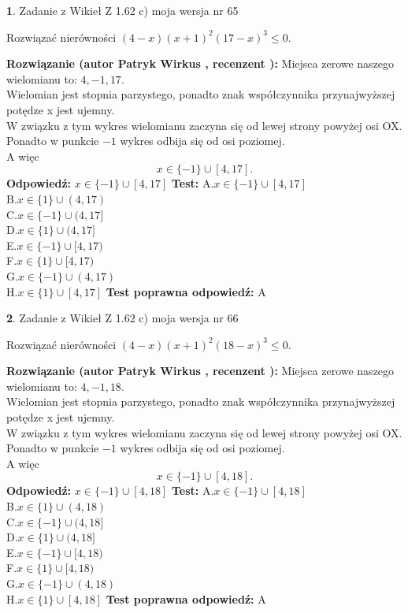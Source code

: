 \documentclass[12pt, a4paper]{article}
\theoremstyle{definition} %
\newtheorem{zad}{}
\newcommand{\zadStart}[1]{\begin{zad}#1\newline}
\newcommand{\zadStop}{\end{zad}}
\newcommand{\rozwStart}[2]{\noindent \textbf{Rozwiązanie (autor #1 , recenzent #2): }\newline}
\newcommand{\rozwStop}{\newline}
\newcommand{\odpStart}{\noindent \textbf{Odpowiedź:}\newline}
\newcommand{\odpStop}{\newline}
\newcommand{\testStart}{\noindent \textbf{Test:}\newline}
\newcommand{\testStop}{\newline}
\newcommand{\kluczStart}{\noindent \textbf{Test poprawna odpowiedź:}\newline}
\newcommand{\kluczStop}{\newline}
\begin{document}
\zadStart{Zadanie z Wikieł Z 1.62 c) moja wersja nr 65}

Rozwiązać nierówności $(4-x)(x+1)^{2}(17-x)^{3}\le0$.
\zadStop
\rozwStart{Patryk Wirkus}{}
Miejsca zerowe naszego wielomianu to: $4, -1, 17$.\\
Wielomian jest stopnia parzystego, ponadto znak współczynnika przy\linebreak najwyższej potędze x jest ujemny.\\ W związku z tym wykres wielomianu zaczyna się od lewej strony powyżej osi OX.\\
Ponadto w punkcie $-1$ wykres odbija się od osi poziomej.\\
A więc $$x \in \{-1\} \cup [4,17].$$
\rozwStop
\odpStart
$x \in \{-1\} \cup [4,17]$
\odpStop
\testStart
A.$x \in \{-1\} \cup [4,17]$\\
B.$x \in \{1\} \cup (4,17)$\\
C.$x \in \{-1\} \cup (4,17]$\\
D.$x \in \{1\} \cup (4,17]$\\
E.$x \in \{-1\} \cup [4,17)$\\
F.$x \in \{1\} \cup [4,17)$\\
G.$x \in \{-1\} \cup (4,17)$\\
H.$x \in \{1\} \cup [4,17]$
\testStop
\kluczStart
A
\kluczStop



\zadStart{Zadanie z Wikieł Z 1.62 c) moja wersja nr 66}

Rozwiązać nierówności $(4-x)(x+1)^{2}(18-x)^{3}\le0$.
\zadStop
\rozwStart{Patryk Wirkus}{}
Miejsca zerowe naszego wielomianu to: $4, -1, 18$.\\
Wielomian jest stopnia parzystego, ponadto znak współczynnika przy\linebreak najwyższej potędze x jest ujemny.\\ W związku z tym wykres wielomianu zaczyna się od lewej strony powyżej osi OX.\\
Ponadto w punkcie $-1$ wykres odbija się od osi poziomej.\\
A więc $$x \in \{-1\} \cup [4,18].$$
\rozwStop
\odpStart
$x \in \{-1\} \cup [4,18]$
\odpStop
\testStart
A.$x \in \{-1\} \cup [4,18]$\\
B.$x \in \{1\} \cup (4,18)$\\
C.$x \in \{-1\} \cup (4,18]$\\
D.$x \in \{1\} \cup (4,18]$\\
E.$x \in \{-1\} \cup [4,18)$\\
F.$x \in \{1\} \cup [4,18)$\\
G.$x \in \{-1\} \cup (4,18)$\\
H.$x \in \{1\} \cup [4,18]$
\testStop
\kluczStart
A
\kluczStop
\end{document}
